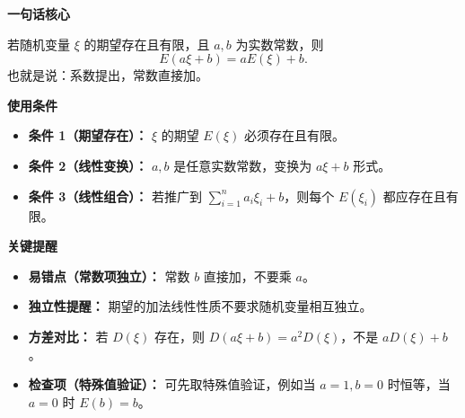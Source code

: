 \begin{summarybox}
	\textbf{\textcolor{CSummary}{一句话核心}}

	若随机变量 $\xi$ 的期望存在且有限，且 $a,b$ 为实数常数，则
	\[
		E(a\xi+b)=aE(\xi)+b.
	\]
	也就是说：系数提出，常数直接加。

	\medskip
	\textbf{\textcolor{CSummary}{使用条件}}
	\begin{itemize}[leftmargin=*, itemsep=0.5em, topsep=0.4em]
		\item \textbf{条件 1（期望存在）：} $\xi$ 的期望 $E(\xi)$ 必须存在且有限。
		\item \textbf{条件 2（线性变换）：} $a,b$ 是任意实数常数，变换为 $a\xi+b$ 形式。
		\item \textbf{条件 3（线性组合）：} 若推广到 $\sum_{i=1}^{n}a_i\xi_i+b$，则每个 $E(\xi_i)$ 都应存在且有限。
	\end{itemize}

	\medskip
	\textbf{\textcolor{CSummary}{关键提醒}}
	\begin{itemize}[leftmargin=*, itemsep=0.5em, topsep=0.4em]
		\item \textbf{易错点（常数项独立）：} 常数 $b$ 直接加，不要乘 $a$。
		\item \textbf{独立性提醒：} 期望的加法线性性质不要求随机变量相互独立。
		\item \textbf{方差对比：} 若 $D(\xi)$ 存在，则 $D(a\xi+b)=a^2D(\xi)$，不是 $aD(\xi)+b$。
		\item \textbf{检查项（特殊值验证）：} 可先取特殊值验证，例如当 $a=1,b=0$ 时恒等，当 $a=0$ 时 $E(b)=b$。
	\end{itemize}
\end{summarybox}